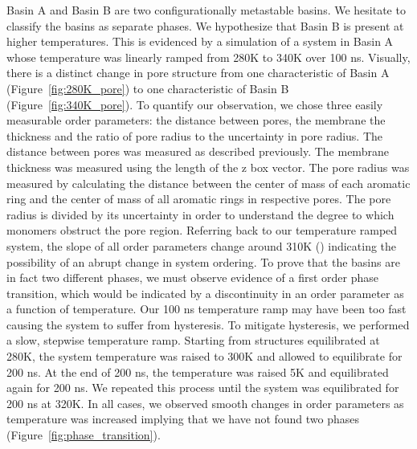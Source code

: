 Basin A and Basin B are two configurationally metastable basins. 
We hesitate to classify the basins as separate phases. We hypothesize
that Basin B is present at higher temperatures. This is evidenced by
a simulation of a system in Basin A whose temperature was linearly
ramped from 280K to 340K over 100 ns. Visually, there is a distinct
change in pore structure from one characteristic of Basin A 
(Figure~\ref{fig:280K_pore}) to one characteristic of Basin B 
(Figure~\ref{fig:340K_pore}). To quantify our observation, we chose 
three easily measurable order parameters: the distance between pores,
the membrane the thickness and the ratio of pore radius to the uncertainty
in pore radius. The distance between pores was measured as described 
previously. The membrane thickness was measured using the length of the
z box vector. The pore radius was measured by calculating the distance
between the center of mass of each aromatic ring and the center of mass
of all aromatic rings in respective pores. The pore radius is divided by
its uncertainty in order to understand the degree to which monomers 
obstruct the pore region. Referring back to our temperature ramped system,
the slope of all order parameters change around 310K 
() indicating the 
possibility of an abrupt change in system ordering. To prove that the 
basins are in fact two different phases, we must observe evidence of a
first order phase transition, which would be indicated by a discontinuity
in an order parameter as a function of temperature. Our 100 ns temperature
ramp may have been too fast causing the system to suffer from hysteresis. To mitigate
hysteresis, we performed a slow, stepwise temperature ramp. Starting from
structures equilibrated at 280K, the system temperature was raised to 
300K and allowed to equilibrate for 200 ns. At the end of 200 ns, the
temperature was raised 5K and equilibrated again for 200 ns. We repeated
this process until the system was equilibrated for 200 ns at 320K. In all
cases, we observed smooth changes in order parameters as temperature was
increased implying that we have not found two phases 
(Figure~\ref{fig:phase_transition}).

